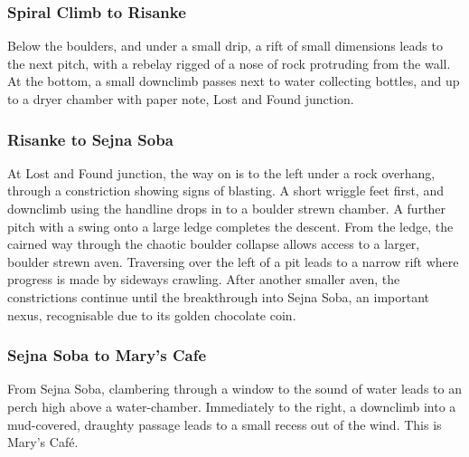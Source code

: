 \hypertarget{spiral-climb-to-risanke}{%
\subsubsection{Spiral Climb to Risanke}\label{spiral-climb-to-risanke}}

Below the boulders, and under a small drip, a rift of small dimensions leads to the next pitch, with a rebelay rigged of a nose of rock protruding from the wall. At the bottom, a small downclimb passes next to water collecting bottles, and up to a dryer chamber with paper note, Lost and Found junction.

\hypertarget{risanke-to-sejna-soba}{%
\subsubsection{Risanke to Sejna Soba}\label{risanke-to-sejna-soba}}

At Lost and Found junction, the way on is to the left under a rock overhang, through a constriction showing signs of blasting. A short wriggle feet first, and downclimb using the handline drops in to a boulder strewn chamber. A further pitch with a swing onto a large ledge completes the descent. From the ledge, the cairned way through the chaotic boulder collapse allows access to a larger, boulder strewn aven. Traversing over the left of a pit leads to a narrow rift where progress is made by sideways crawling. After another smaller aven, the constrictions continue until the breakthrough into Sejna Soba, an important nexus, recognisable due to its golden chocolate coin.

\hypertarget{sejna-soba-to-marys-cafe}{%
\subsubsection{Sejna Soba to Mary's Cafe}\label{sejna-soba-to-marys-cafe}}

From Sejna Soba, clambering through a window to the sound of water leads to an perch high above a water-chamber. Immediately to the right, a downclimb into a mud-covered, draughty passage leads to a small recess out of the wind. This is Mary's Café.

